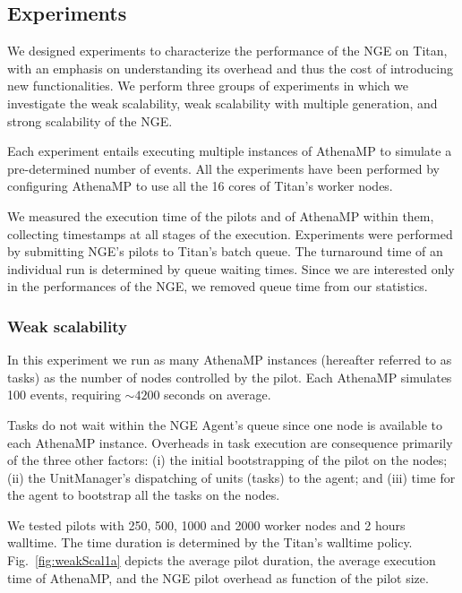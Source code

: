 \subsection{Experiments}
\label{sec:ngeExp}

We designed experiments to characterize the performance of the NGE on Titan,
with an emphasis on understanding its overhead and thus the cost of introducing
new functionalities.  We perform three groups of experiments in which we
investigate the weak scalability, weak scalability with multiple generation, and
strong scalability of the NGE.

Each experiment entails executing multiple instances of AthenaMP 
to simulate a pre-determined number of events. All the experiments have been
performed by  configuring AthenaMP to use all the 16 cores  of Titan's worker
nodes.

We  measured the execution time of the pilots and of AthenaMP 
within them, collecting timestamps at  all stages of the execution. Experiments
were performed  by  submitting NGE's pilots  to Titan's batch queue.  The
turnaround time of an individual run is determined by queue waiting times. Since
we are interested only in the performances of the NGE, we removed queue time
from our statistics.

\subsubsection{Weak scalability}

In this experiment  we run as many AthenaMP instances (hereafter referred to as
tasks)  as the number of nodes controlled by the pilot. Each AthenaMP simulates
100 events, requiring $\sim 4200$ seconds on average.

Tasks do not  wait within the NGE Agent's queue since  one node  is available to
each AthenaMP instance.  Overheads in task execution are consequence primarily
of the three other factors: (i) the  initial bootstrapping of the pilot on the
nodes; (ii) the UnitManager's dispatching of  units (tasks) to the agent; and
(iii) time for the agent to bootstrap all the tasks on the nodes.

We tested  pilots  with 250, 500, 1000 and 2000 worker nodes and 2 hours
walltime. The time duration is determined by the Titan's walltime policy.
Fig.~\ref{fig:weakScal1a} depicts the average pilot duration, the average
execution time of AthenaMP, and the NGE pilot overhead as function of the pilot
size.

